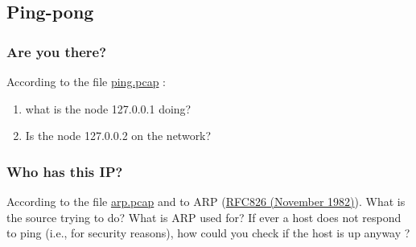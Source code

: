 \documentclass[11pt]{article}
\begin{document}
\subsection{Ping-pong}
\subsubsection{Are you there?}
According to the file \color{blue}\href{http://teaching.auzias.net/db/ping.pcap}{ping.pcap} \color{black}:
  \begin{enumerate}
    \item what is the node 127.0.0.1 doing?
    \item Is the node 127.0.0.2 on the network?
  \end{enumerate}
\subsubsection{Who has this IP?}
According to the file \color{blue}\href{http://teaching.auzias.net/db/arp.pcap}{arp.pcap} \color{black} and to ARP (\color{blue}\href{http://tools.ietf.org/html/rfc826}{RFC826 (November 1982)})\color{black}. What is the source trying to do? What is ARP used for? If ever a host does not respond to ping (i.e., for security reasons), how could you check if the host is up anyway ?
\end{document}
